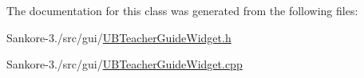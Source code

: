 The documentation for this class was generated from the following files\-:\begin{DoxyCompactItemize}
\item 
Sankore-\/3./src/gui/\hyperlink{_u_b_teacher_guide_widget_8h}{U\-B\-Teacher\-Guide\-Widget.\-h}\item 
Sankore-\/3./src/gui/\hyperlink{_u_b_teacher_guide_widget_8cpp}{U\-B\-Teacher\-Guide\-Widget.\-cpp}\end{DoxyCompactItemize}
